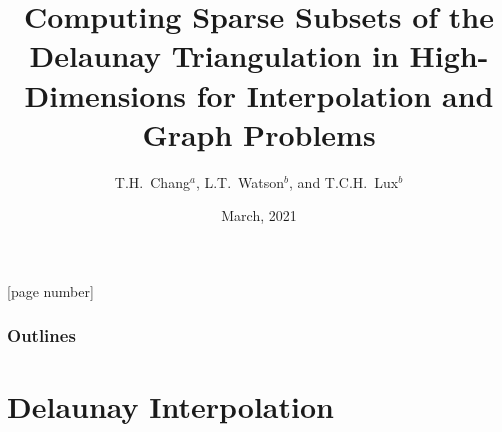 \documentclass[aspectratio=169]{beamer}
\title{Computing Sparse Subsets of the Delaunay Triangulation in
High-Dimensions for Interpolation and Graph Problems}
\author{T.H.~Chang$^a$, L.T.~Watson$^b$, and T.C.H.~Lux$^b$}
\date{March, 2021}
\institute{$^a$Argonne National Laboratory\\
 $^b$Virginia Polytechnic Institute and State University}
\begin{document}
{
\frame{\titlepage}
}

[page number]{}

\begin{frame}
  \frametitle{Outlines}
  \tableofcontents
\end{frame}

\section{Delaunay Interpolation}

\end{document}
